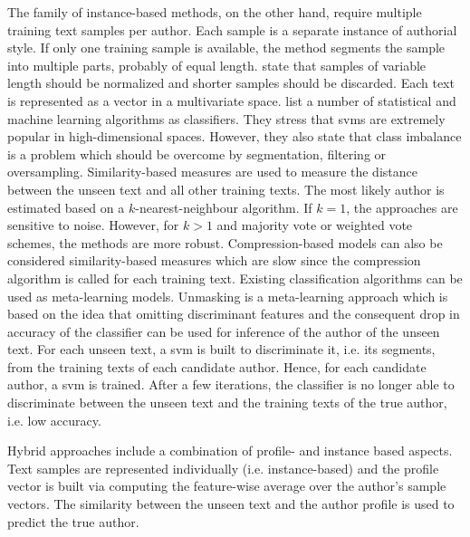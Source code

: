The family of instance-based methods, on the other hand, require multiple training text samples per author. 
Each sample is a separate instance of authorial style.
If only one training sample is available, the method segments the sample into multiple parts, probably of equal length.
\citet{stamatatos_survey_2009} state that samples of variable length should be normalized and 
shorter samples should be discarded.
Each text is represented as a vector in a multivariate space.
\citet{stamatatos_survey_2009} list a number of statistical and machine learning algorithms as classifiers.
They stress that \acp{svm} are extremely popular in high-dimensional spaces.
However, they also state that class imbalance is a problem 
which should be overcome by segmentation, filtering or oversampling.
Similarity-based measures are used to measure the distance between the unseen text and all other training texts.
The most likely author is estimated based on a $k$-nearest-neighbour algorithm.
If $k=1$, the approaches are sensitive to noise.
However, for $k>1$ and majority vote or weighted vote schemes, the methods are more robust.
Compression-based models can also be considered similarity-based measures which are slow 
since the compression algorithm is called for each training text.
Existing classification algorithms can be used as meta-learning models.
Unmasking is a meta-learning approach which is based on the idea that
omitting discriminant features and the consequent drop in accuracy of the classifier 
can be used for inference of the author of the unseen text.
For each unseen text, a \ac{svm} is built to discriminate it, i.e. its segments, 
from the training texts of each candidate author.
Hence, for each candidate author, a \ac{svm} is trained.
After a few iterations, the classifier is no longer able to discriminate between the unseen text and 
the training texts of the true author, i.e. low accuracy.


Hybrid approaches include a combination of profile- and instance based aspects.
Text samples are represented individually (i.e. instance-based) and 
the profile vector is built via computing the feature-wise average over the author's sample vectors.
The similarity between the unseen text and the author profile is used to predict the true author.
